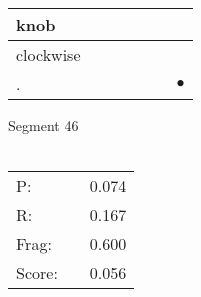 \documentclass[landscape]{article}
\newcommand{\ssp}{\hspace{2pt}}
\newcommand{\mex}{\cellcolor{g}$\bullet$}
\begin{document}
\begin{tabular}{|l|p{10pt}|p{10pt}|p{10pt}|p{10pt}|p{10pt}|p{10pt}|}
\hline
\ssp knob \ssp&\hspace{2pt}&\hspace{2pt}&\hspace{2pt}&\hspace{2pt}&\hspace{2pt}&\hspace{2pt}\\
\hline
\ssp clockwise \ssp&\hspace{2pt}&\hspace{2pt}&\hspace{2pt}&\hspace{2pt}&\hspace{2pt}&\hspace{2pt}\\
\hline
\ssp \cellcolor{ref5}. \ssp&\hspace{2pt}&\hspace{2pt}&\hspace{2pt}&\hspace{2pt}&\hspace{2pt}&\hspace{2pt}\mex\\
\hline
\end{tabular}

\vspace{6pt}
\noindent Segment 46\\\\
\noindent\begin{tabular}{lm{12pt}r}
\hline
P:&&0.074\\
R:&&0.167\\
Frag:&&0.600\\
Score:&&0.056\\
\end{tabular}

\newpage
\end{document}
